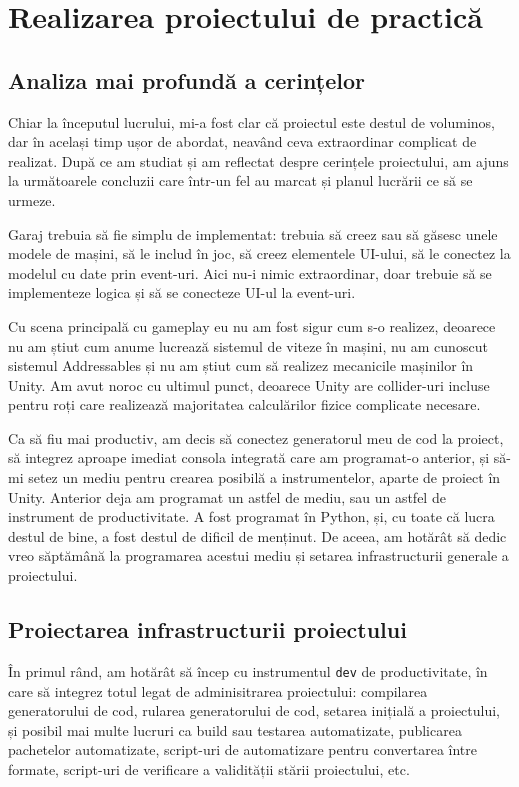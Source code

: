 \documentclass[a4paper,12pt]{report}
\begin{document}
\chapter{Realizarea proiectului de practică}


\section{Analiza mai profundă a cerințelor}

Chiar la începutul lucrului, mi-a fost clar că proiectul este destul de voluminos, dar în același timp ușor de abordat, neavând ceva extraordinar complicat de realizat.
După ce am studiat și am reflectat despre cerințele proiectului, am ajuns la următoarele concluzii care într-un fel au marcat și planul lucrării ce să se urmeze.

Garaj trebuia să fie simplu de implementat: trebuia să creez sau să găsesc unele modele de mașini, să le includ în joc, să creez elementele \ac{UI}-ului, să le conectez la modelul cu date prin event-uri.
Aici nu-i nimic extraordinar, doar trebuie să se implementeze logica și să se conecteze \ac{UI}-ul la event-uri.

Cu scena principală cu gameplay eu nu am fost sigur cum s-o realizez, deoarece nu am știut cum anume lucrează sistemul de viteze în mașini, nu am cunoscut sistemul Addressables și nu am știut cum să realizez mecanicile mașinilor în Unity.
Am avut noroc cu ultimul punct, deoarece Unity are collider-uri incluse pentru roți care realizează majoritatea calculărilor fizice complicate necesare.

Ca să fiu mai productiv, am decis să conectez generatorul meu de cod la proiect, să integrez aproape imediat consola integrată care am programat-o anterior, și să-mi setez un mediu pentru crearea posibilă a instrumentelor, aparte de proiect în Unity.
Anterior deja am programat un astfel de mediu, sau un astfel de instrument de productivitate.
A fost programat în Python, și, cu toate că lucra destul de bine, a fost destul de dificil de menținut.
De aceea, am hotărât să dedic vreo săptămână la programarea acestui mediu și setarea infrastructurii generale a proiectului.


\section{Proiectarea infrastructurii proiectului}

În primul rând, am hotărât să încep cu instrumentul \texttt{dev} de productivitate, în care să integrez totul legat de adminisitrarea proiectului: compilarea generatorului de cod, rularea generatorului de cod, setarea inițială a proiectului, și posibil mai multe lucruri ca build sau testarea automatizate, publicarea pachetelor automatizate, script-uri de automatizare pentru convertarea între formate, script-uri de verificare a validității stării proiectului, etc.
\end{document}

